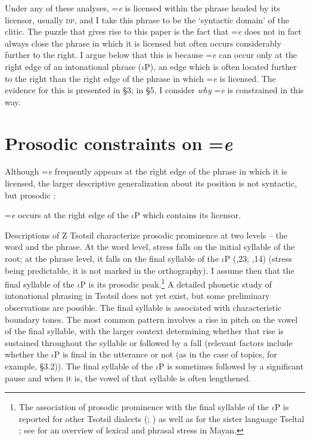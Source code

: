 \documentclass[output=paper,
modfonts
]{LSP/langsci}
\begin{document}
Under any of these analyses, =\emph{e} is licensed within the phrase headed by its licensor, usually \textsc{dp}, and I take this 
phrase to be the `syntactic domain' of the clitic.  
The puzzle that gives rise to this paper is the fact that =\emph{e} does not in fact always close the phrase in 
which it is licensed but often occurs considerably further to the right.  
I argue below that this is because =\emph{e} can occur only at 
the right edge of an intonational phrase ($\iota$P), an edge which is often located further to the right than the right edge of the
phrase in  which  =\emph{e} is licensed. The evidence for this is presented in \S3; in \S5, I consider \emph{why} =\emph{e}
is constrained in this way.

 \section{Prosodic constraints on =\emph{e}}
Although =\emph{e}  frequently appears at the right edge of the phrase in which it is licensed,
 the larger descriptive generalization about its position is not syntactic, but prosodic \citep{aissen1992, skopeteas2010}:
 \begin{exe}
\ex
=\emph{e} occurs at the right edge of the $\iota$P which contains its licensor.
\label{exe:gen6}
\end{exe}
Descriptions of Z Tsotsil characterize prosodic prominence at two levels  --  the word and the phrase. 
At the word level, stress falls on the initial syllable of the root; at the phrase level, it
 falls on the final syllable of the $\iota$P (\citealt{laughlin1975},23; \citealt{haviland1981},14) (stress being predictable, it is not marked in the orthography).
I assume then that the final syllable of the $\iota$P is its prosodic  peak.\footnote
{The association of prosodic prominence with the final syllable of the $\iota$P is reported for other Tsotsil dialects (\citealt[4]{cowan1969}; \citealt[11]{delgaty78})
 as well as for the sister language Tseltal \citep{shklovsky2011, polian2013}; see \citet[\S6.1]{bennett2016} for an overview of lexical and phrasal
stress in Mayan.}
A detailed phonetic study of intonational phrasing in Tsotsil does not yet exist, but some preliminary observations are possible. 
The final syllable is associated with characteristic boundary tones. The most common pattern involves a rise in pitch on the vowel of the final syllable,
with the larger context determining whether that rise is sustained throughout the syllable or followed by a fall (relevant factors include whether
the $\iota$P is final in the utterance or not (as in the case of topics, for example, \S3.2)). 
The final syllable of the $\iota$P is sometimes followed by a significant pause and when it is, the vowel of that syllable is often lengthened.
\end{document}
